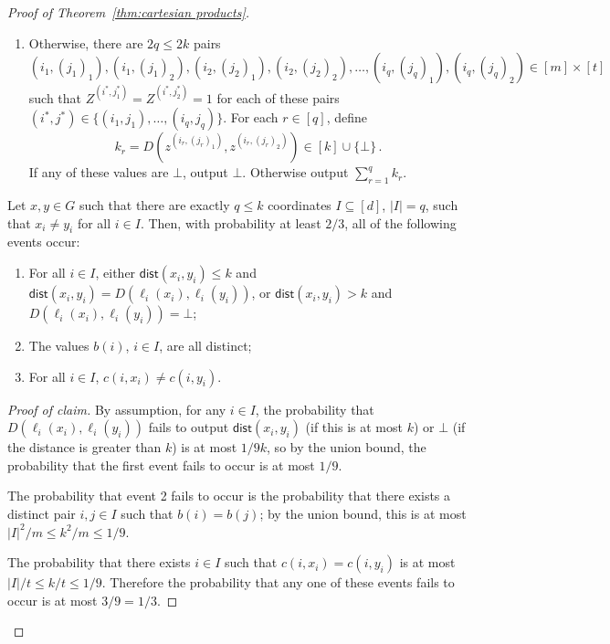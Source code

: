 \documentclass{theoretics}
\newcommand{\dist}{\mathsf{dist}}
\newcommand{\zo}{\{0,1\}}
\begin{document}
\begin{proof}[Proof of Theorem~\ref{thm:cartesian products}]
\begin{enumerate}
$Z^{(i,j)} = 1$, output $\bot$.
\item Otherwise, there are $2q \leq 2k$ pairs
\[
(i_1, (j_1)_1), (i_1, (j_1)_2),
(i_2, (j_2)_1), (i_2, (j_2)_2), \dotsc,
(i_q, (j_q)_1), (i_q, (j_q)_2) \in [m] \times [t]
\]
such that $Z^{(i^*,j^*_1)}=Z^{(i^*,j^*_2)} = 1$ for each of these pairs $(i^*, j^*) \in \{ (i_1,
j_1), \dotsc, (i_q, j_q)\}$. 
For each $r \in [q]$, define
\[
  k_r = D(z^{(i_r, (j_r)_1)}, z^{(i_r, (j_r)_2)} ) \in [k] \cup \{\bot\} \,.
\]
If any of these values are $\bot$, output $\bot$. Otherwise output $\sum_{r=1}^q k_r$.
\end{enumerate}
\begin{claim}
\label{claim:product good events}
Let $x,y \in G$ such that there are exactly $q \leq k$ coordinates $I \subseteq [d]$, $|I|
= q$, such that $x_i \neq y_i$ for all $i \in I$.  Then, with probability at least $2/3$, all
of the following events occur:
\begin{enumerate}
\item For all $i \in I$, either $\dist(x_i, y_i) \leq k$ and $\dist(x_i, y_i)
= D(\ell_i(x_i), \ell_i(y_i))$, or $\dist(x_i, y_i) > k$ and $D(\ell_i(x_i), \ell_i(y_i)) =
\bot$;
\item The values $b(i)$, $i \in I$, are all distinct;
\item For all $i \in I$, $c(i, x_i) \neq c(i, y_i)$.
\end{enumerate}
\end{claim}
\begin{proof}[Proof of claim]
By assumption, for any $i \in I$, the probability that $D(\ell_i(x_i),\ell_i(y_i))$ fails to output
$\dist(x_i,y_i)$ (if this is at most $k$) or $\bot$ (if the distance is greater than $k$) is at most
$1/9k$, so by the union bound, the probability that the first event fails to occur is at most
$1/9$.

The probability that event 2 fails to occur is the probability that there exists a distinct pair
$i,j \in I$ such that $b(i)=b(j)$; by the union bound, this is at most $|I|^2/m \leq k^2/m \leq
1/9$.

The probability that there exists $i \in I$ such that $c(i,x_i) = c(i,y_i)$ is at most $|I|/t \leq
k/t \leq 1/9$. Therefore the probability that any one of these events fails to occur is at most $3/9
= 1/3$.
\end{proof}


\end{proof}
\end{document}
